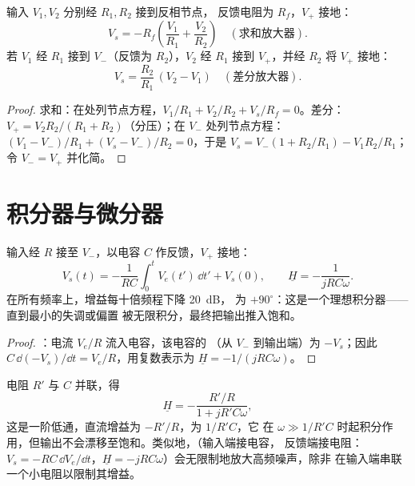 \begin{proposition}[求和放大器与差分放大器]\label{prop:b1:operational-amplifier:sumdiff}
输入 $V_1, V_2$ 分别经 $R_1, R_2$ 接到反相节点，
反馈电阻为 $R_f$，$V_+$ 接地：
\[
V_s = -R_f\left(\frac{V_1}{R_1} + \frac{V_2}{R_2}\right)
\quad (\text{求和放大器}).
\]
若 $V_1$ 经 $R_1$ 接到 $V_-$（反馈为 $R_2$），$V_2$ 经
$R_1$ 接到 $V_+$，并经 $R_2$ 将 $V_+$ 接地：
\[
V_s = \frac{R_2}{R_1}\,(V_2 - V_1)
\quad (\text{差分放大器}).
\]
\end{proposition}

\begin{proof}
求和：在处列节点方程，$V_1/R_1 + V_2/R_2 + V_s/R_f =
0$。差分：$V_+ = V_2R_2/(R_1 + R_2)$（分压）；在 $V_-$ 处列节点方程：
$(V_1 - V_-)/R_1 + (V_s - V_-)/R_2 = 0$，于是 $V_s = V_-(1 + R_2/R_1) -
V_1R_2/R_1$；令 $V_- = V_+$ 并化简。
\end{proof}

\section{积分器与微分器}

\begin{proposition}[积分器]\label{prop:b1:operational-amplifier:integrator}
输入经 $R$ 接至 $V_-$，以电容 $C$ 作反馈，$V_+$
接地：
\[
V_s(t) = -\frac{1}{RC}\int_0^t V_e(t')\,\dd t' + V_s(0),
\qquad
\underline H = -\frac{1}{jRC\omega} .
\]
在所有频率上，增益每十倍频程下降 \qty{20}{dB}，
为 $+90^\circ$：这是一个理想积分器——直到最小的失调或偏置
被无限积分，最终把输出推入饱和。
\end{proposition}

\begin{proof}
：电流 $V_e/R$ 流入电容，该电容的
（从 $V_-$ 到输出端）为 $-V_s$；因此 $C\,\dd(-V_s)/\dd t
= V_e/R$，用复数表示为 $\underline H = -1/(jRC\omega)$。
\end{proof}

\begin{remark}[驯服积分器]\label{rem:b1:operational-amplifier:pseudo}
电阻 $R'$ 与 $C$ 并联，得
\[
\underline H = -\frac{R'/R}{1 + jR'C\omega},
\]
这是一阶低通，直流增益为 $-R'/R$，为 $1/R'C$，它
在 $\omega \gg 1/R'C$ 时起积分作用，但输出不会漂移至饱和。类似地，（输入端接电容，
反馈端接电阻：$V_s = -RC\,\dd V_e/\dd t$，$\underline H =
-jRC\omega$）会无限制地放大高频噪声，除非
在输入端串联一个小电阻以限制其增益。
\end{remark}


